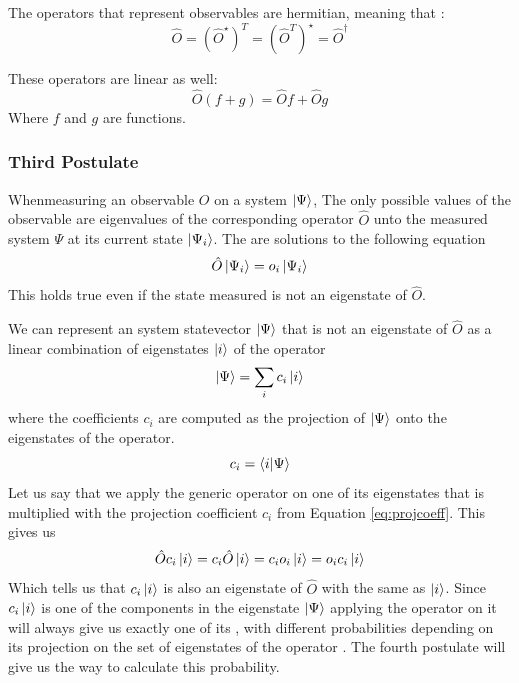 \documentclass[../master_thesis.tex]{subfiles}
\begin{document}
The operators that represent observables are hermitian, meaning that
\cite{Cohen:1973}:
\begin{equation}
  \hat{O} = (\hat{O}^{\star})^T = (\hat{O}^T)^{\star} = \hat{O}^{\dagger}
\end{equation}

These operators are linear as well:
\begin{equation}
    \hat{O}(f + g) = \hat{O}f + \hat{O}g\label{eq:oplinearity}
\end{equation}
Where $f$ and $g$ are functions.

\subsubsection{Third Postulate}
Whenmeasuring an observable $O$ on a system $\ket{\Psi}$, The only possible
values of the observable are eigenvalues of the corresponding operator $\hat{O}$
unto the measured system $\Psi$ at its current state $\ket{\Psi_i}$. The \eivals
are solutions to the following equation \cite{Cohen:1973}
\begin{equation}
  \hat{O}\ket{\Psi_i} = o_i \ket{\Psi_i}
\end{equation}
This holds true even if the state measured is not an eigenstate of $\hat{O}$.

We can represent an system statevector $\ket{\Psi}$ that is not an eigenstate
of $\hat{O}$ as a linear combination of eigenstates $\ket{i}$ of the operator
\begin{equation}
  \ket{\Psi} = \sum_i c_i \ket{i}
\end{equation}
where the coefficients $c_i$ are computed as the projection of $\ket{\Psi}$ onto
the eigenstates of the operator.
\begin{equation}\label{eq:projcoeff}
  c_i = \braket{i|\Psi}
\end{equation}
Let us say that we apply the generic operator on one of its eigenstates that
is multiplied with the projection coefficient $c_i$ from Equation \ref{eq:projcoeff}.
This gives us
\begin{equation}
  \hat{O}c_i\ket{i} = c_i\hat{O}\ket{i} = c_i o_i\ket{i} = o_i c_i\ket{i}
\end{equation}
Which tells  us that $c_i\ket{i}$ is also an eigenstate of $\hat{O}$ with the
same \eival as $\ket{i}$. Since $c_i\ket{i}$ is one of the components in the
eigenstate $\ket{\Psi}$ applying the operator on it will always give us exactly
one of its \eivals, with different probabilities  depending on its projection on the set
of eigenstates of the operator \cite{Cohen:1973}. The fourth postulate will give
us the way to calculate this probability.
\end{document}
